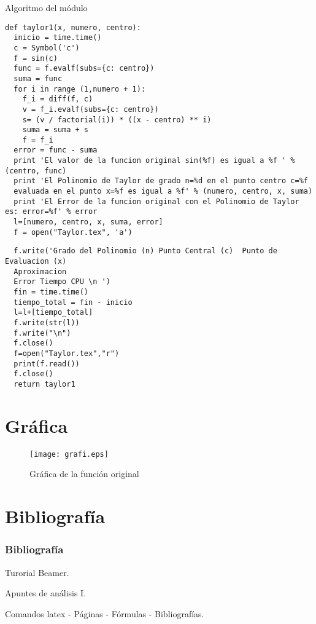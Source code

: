 \documentclass{beamer}
\begin{document}
{\begin{block}{Algoritmo del módulo}
\begin{verbatim}
def taylor1(x, numero, centro):
  inicio = time.time()
  c = Symbol('c')
  f = sin(c)
  func = f.evalf(subs={c: centro})
  suma = func
  for i in range (1,numero + 1):
    f_i = diff(f, c)
    v = f_i.evalf(subs={c: centro})
    s= (v / factorial(i)) * ((x - centro) ** i)    
    suma = suma + s
    f = f_i
  error = func - suma
  print 'El valor de la funcion original sin(%f) es igual a %f ' % (centro, func)
  print 'El Polinomio de Taylor de grado n=%d en el punto centro c=%f 
  evaluada en el punto x=%f es igual a %f' % (numero, centro, x, suma)
  print 'El Error de la funcion original con el Polinomio de Taylor es: error=%f' % error
  l=[numero, centro, x, suma, error]
  f = open("Taylor.tex", 'a')
\end{verbatim}
\end{block}
\begin{block}{ }
\begin{verbatim}
  f.write('Grado del Polinomio (n) Punto Central (c)  Punto de Evaluacion (x)  
  Aproximacion
  Error Tiempo CPU \n ')
  fin = time.time()
  tiempo_total = fin - inicio
  l=l+[tiempo_total]
  f.write(str(l))
  f.write("\n")
  f.close()
  f=open("Taylor.tex","r")
  print(f.read())
  f.close()
  return taylor1
\end{verbatim}
\end{block}
}
\section{Gráfica}
\begin{frame}
\begin{figure}[!th]
\begin{center}
\texttt{[image: grafi.eps]}
\caption{Gráfica de la función original}
\label{fig:1}
\end{center}
\end{figure}
\end{frame}

\section{Bibliografía}
\begin{frame}
  \frametitle{Bibliografía}

  \begin{thebibliography}{10}

    \beamertemplatebookbibitems
    Turorial Beamer. 

    \beamertemplatebookbibitems
    Apuntes de análisis I.
    
    \beamertemplatebookbibitems
    Comandos latex - Páginas - Fórmulas - Bibliografías. 

   

  \end{thebibliography}
\end{frame}

\end{document}
